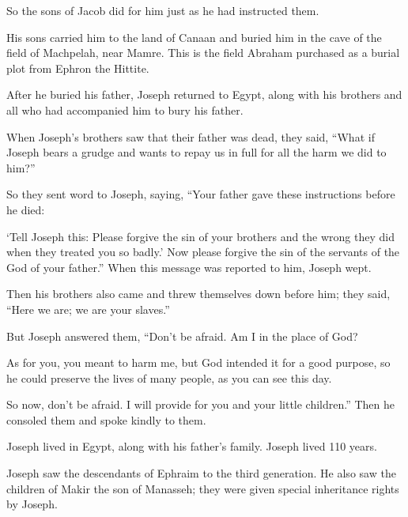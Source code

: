 \begin{scripture}
 So the sons of Jacob did for him just as he had instructed them.
 His sons carried him to the land of Canaan and buried him in the cave of the field of Machpelah, near Mamre. This is the field Abraham purchased as a burial plot from Ephron the Hittite.
 After he buried his father, Joseph returned to Egypt, along with his brothers and all who had accompanied him to bury his father.
\everypar{}

 When Joseph's brothers saw that their father was dead, they said, ``What if Joseph bears a grudge and wants to repay us in full for all the harm we did to him?''
 So they sent word to Joseph, saying, ``Your father gave these instructions before he died:
 `Tell Joseph this: Please forgive the sin of your brothers and the wrong they did when they treated you so badly.' Now please forgive the sin of the servants of the God of your father.'' When this message was reported to him, Joseph wept.
 Then his brothers also came and threw themselves down before him; they said, ``Here we are; we are your slaves.''
 But Joseph answered them, ``Don't be afraid. Am I in the place of God?
 As for you, you meant to harm me, but God intended it for a good purpose, so he could preserve the lives of many people, as you can see this day.
 So now, don't be afraid. I will provide for you and your little children.'' Then he consoled them and spoke kindly to them.
\everypar{}

 Joseph lived in Egypt, along with his father's family. Joseph lived 110 years.
 Joseph saw the descendants of Ephraim to the third generation. He also saw the children of Makir the son of Manasseh; they were given special inheritance rights by Joseph.
\everypar{}


\end{scripture}
